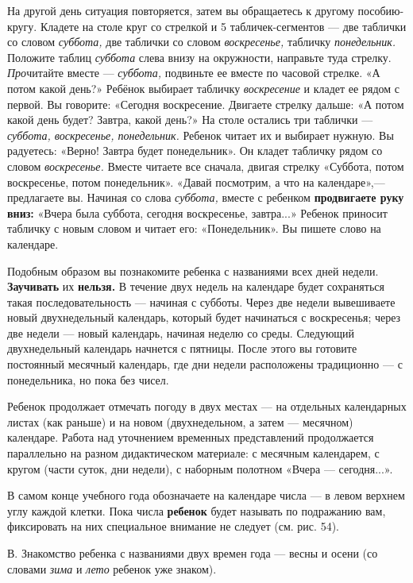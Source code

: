 \documentclass{book}
\renewcommand{\emph}[1]{\textit{#1}}
\begin{document}
На другой день ситуация повторяется, затем вы обращаетесь к другому
пособию-кругу. Кладете на столе круг со стрелкой и 5 табличек-сегментов
--- две таблички со словом \emph{суббота,} две таблички со словом
\emph{воскресенье,} табличку \emph{понедельник.} Положите таблиц
\emph{суббота} слева внизу на окружности, направьте туда стрелку.
\emph{Про}читайте вместе --- \emph{суббота,} подвиньте ее вместе по
часовой стрелке. «А потом какой день?» Ребёнок выбирает табличку
\emph{воскресение} и кладет ее рядом с первой. Вы говорите: «Сегодня
воскресение. Двигаете стрелку дальше: «А потом какой день будет? Завтра,
какой день?» На столе остались три таблички --- \emph{суббота,
воскресенье, понедельник.} Ребенок читает их и выбирает нужную. Вы
радуетесь: «Верно! Завтра будет понедельник». Он кладет табличку рядом
со словом \emph{воскресенье.} Вместе читаете все сначала, двигая стрелку
«Суббота, потом воскресенье, потом понедельник». «Давай посмотрим, а что
на календаре»,--- предлагаете вы. Начиная со слова \emph{суббота,}
вместе с ребенком \textbf{продвигаете руку вниз:} «Вчера была суббота,
сегодня воскресенье, завтра...» Ребенок приносит табличку с новым словом
и читает его: «Понедельник». Вы пишете слово на календаре.

Подобным образом вы познакомите ребенка с названиями всех дней недели.
\textbf{Заучивать} их \textbf{нельзя.} В течение двух недель на
календаре будет сохраняться такая последовательность --- начиная с
субботы. Через две недели вывешиваете новый двухнедельный календарь,
который будет начинаться с воскресенья; через две недели --- новый
календарь, начиная неделю со среды. Следующий двухнедельный календарь
начнется с пятницы. После этого вы готовите постоянный месячный
календарь, где дни недели расположены традиционно --- с понедельника, но
пока без чисел.

Ребенок продолжает отмечать погоду в двух местах --- на отдельных
календарных листах (как раньше) и на новом (двухнедельном, а затем ---
месячном) календаре. Работа над уточнением временных представлений
продолжается параллельно на разном дидактическом материале: с месячным
календарем, с кругом (части суток, дни недели), с наборным полотном
«Вчера --- сегодня...».

В самом конце учебного года обозначаете на календаре числа --- в левом
верхнем углу каждой клетки. Пока числа \textbf{ребенок} будет называть
по подражанию вам, фиксировать на них специальное внимание не следует
(см. рис. 54).

В. Знакомство ребенка с названиями двух времен года --- весны и осени
(со словами \emph{зима} и \emph{лето} ребенок уже знаком).
\end{document}
